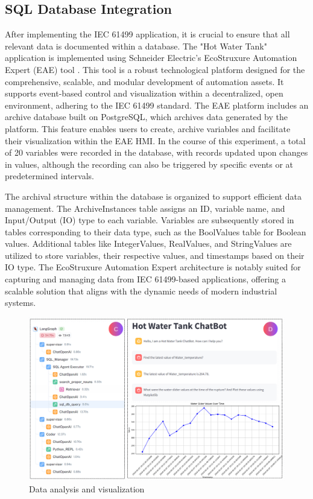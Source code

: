 \begin{bibunit}
\subsection{SQL Database Integration}

After implementing the IEC 61499 application, it is crucial to ensure that all relevant data is documented within a database. The "Hot Water Tank" application is implemented using Schneider Electric's EcoStruxure Automation Expert (EAE) tool \cite{ecostruxure2023}. This tool is a robust technological platform designed for the comprehensive, scalable, and modular development of automation assets. It supports event-based control and visualization within a decentralized, open environment, adhering to the IEC 61499 standard. The EAE platform includes an archive database built on PostgreSQL, which archives data generated by the platform. This feature enables users to create, archive variables and facilitate their visualization within the EAE HMI. In the course of this experiment, a total of 20 variables were recorded in the database, with records updated upon changes in values, although the recording can also be triggered by specific events or at predetermined intervals.

The archival structure within the database is organized to support efficient data management. The ArchiveInstances table assigns an ID, variable name, and Input/Output (IO) type to each variable. Variables are subsequently stored in tables corresponding to their data type, such as the BoolValues table for Boolean values. Additional tables like IntegerValues, RealValues, and StringValues are utilized to store variables, their respective values, and timestamps based on their IO type.  The EcoStruxure Automation Expert architecture is notably suited for capturing and managing data from IEC 61499-based applications, offering a scalable solution that aligns with the dynamic needs of modern industrial systems.


\begin{figure}
    \centering
    \includegraphics[width=.85\textwidth]{MX_Papers/Paper12/images/Result.PNG}
    \caption{Data analysis and visualization}
    \label{fig:results}
\end{figure}



\end{bibunit}
